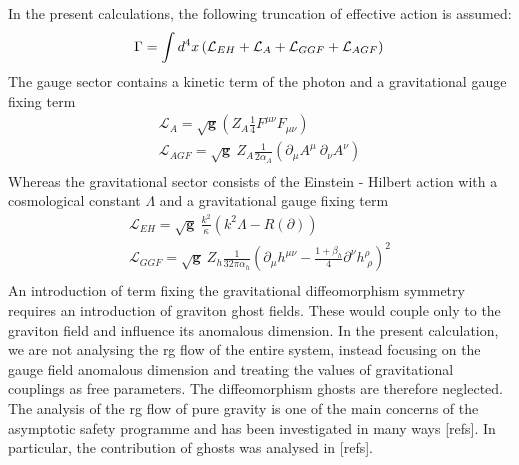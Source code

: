 \documentclass[11pt, a4paper]{article}
\begin{document}
In the present calculations, the following truncation of effective action is assumed:
\begin{equation}
    \Gamma = \int d^4 x \left( \mathcal{L}_{EH} + \mathcal{L}_A + \mathcal{L}_{GGF} + \mathcal{L}_{AGF} \right) \\
\end{equation}
The gauge sector contains a kinetic term of the photon
and a gravitational gauge fixing term
\begin{gather}
    \mathcal{L}_A =  \sqrt{\mathbf{g}} \left( Z_A \frac{1}{4} F^{\mu\nu} F_{\mu\nu} \right)\\%
    \mathcal{L}_{AGF} = \sqrt{\mathbf{g}} \ Z_A \frac{1}{2 \alpha_A} \left( \partial_\mu A^\mu \ \partial_\nu A^\nu \right) \\
\end{gather}
Whereas the gravitational sector consists of the Einstein - Hilbert action with a cosmological constant $\Lambda$ and a gravitational gauge fixing term
\begin{gather}
    \mathcal{L}_{EH} = \sqrt{\mathbf{g}} \ \frac{k^2}{\kappa} \left( k^2 \Lambda - R(\partial)\right) \\
    \mathcal{L}_{GGF} = \sqrt{\mathbf{g}} \ Z_h \frac{1}{32 \pi \alpha_h} \left(\partial_\mu h^{\mu\nu} - \frac{1+\beta_h}{4} \partial^\nu h^\rho_{\; \rho} \right)^2\\
\end{gather}
An introduction of term fixing the gravitational diffeomorphism symmetry requires an introduction of graviton ghost fields.
These would couple only to the graviton field and influence its anomalous dimension. In the present calculation, we are not
analysing the rg flow of the entire system, instead focusing on the gauge field anomalous dimension and treating the values of
gravitational couplings as free parameters. The diffeomorphism ghosts are therefore neglected. The 
analysis of the rg flow of pure gravity is one of the main concerns of the asymptotic safety programme and has been
investigated in many ways [refs]. In particular, the contribution of ghosts was analysed in [refs]. %
\end{document}
